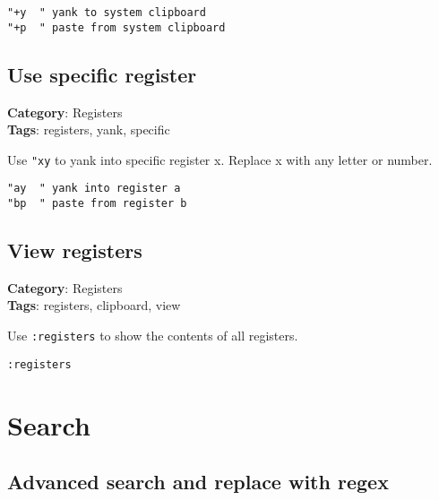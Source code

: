 {{{{{{{{{{{\begin{Exa*}{}
\begin{Verbatim}[fontsize=\footnotesize, breaklines, breakanywhere]
"+y  " yank to system clipboard
"+p  " paste from system clipboard
\end{Verbatim}
\end{Exa*}

\section{Use specific register}

\textbf{Category}: Registers\\ \textbf{Tags}: registers, yank, specific
\vspace{0.5cm}

Use {\footnotesize \Verb§"xy§} to yank into specific register x. Replace x with any letter or number.

\begin{Exa*}{}
\begin{Verbatim}[fontsize=\footnotesize, breaklines, breakanywhere]
"ay  " yank into register a
"bp  " paste from register b
\end{Verbatim}
\end{Exa*}

\section{View registers}

\textbf{Category}: Registers\\ \textbf{Tags}: registers, clipboard, view
\vspace{0.5cm}

Use {\footnotesize \Verb§:registers§} to show the contents of all registers.

\begin{Exa*}{}
\begin{Verbatim}[fontsize=\footnotesize, breaklines, breakanywhere]
:registers
\end{Verbatim}
\end{Exa*}

\chapter{Search}
\section{Advanced search and replace with regex}

}}}}}}}}}}}
